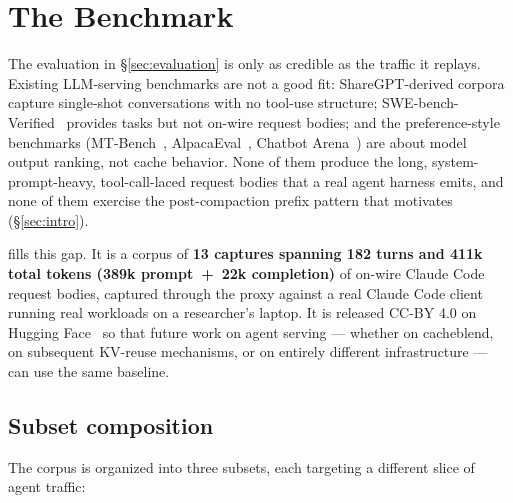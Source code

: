 
\section{The \dataset{} Benchmark}
\label{sec:benchmark}

The evaluation in \S\ref{sec:evaluation} is only as credible as
the traffic it replays. Existing LLM-serving benchmarks are not a good
fit: ShareGPT-derived corpora capture single-shot conversations with no
tool-use structure; SWE-bench-Verified~\cite{swe-bench-verified,
swe-bench-iclr} provides tasks but not on-wire request bodies; and the
preference-style benchmarks (MT-Bench~\cite{mtbench},
Alpaca\-Eval~\cite{alpacaeval}, Chatbot
Arena~\cite{chatbot-arena}) are about model output ranking, not cache
behavior. None of them produce the long, system-prompt-heavy,
tool-call-laced request bodies that a real agent harness emits, and
none of them exercise the post-compaction prefix pattern that motivates
\sys{} (\S\ref{sec:intro}).

\dataset{} fills this gap. It is a corpus of \textbf{13 captures
spanning 182 turns and 411k total tokens (389k prompt~+~22k
completion)} of on-wire Claude Code request bodies, captured through
the \sys{} proxy against a real Claude Code client running real
workloads on a researcher's laptop. It is released CC-BY 4.0 on
Hugging Face~\cite{claudecode-trace-hf} so that future work on agent
serving --- whether on cacheblend, on subsequent KV-reuse mechanisms,
or on entirely different infrastructure --- can use the same baseline.

\subsection{Subset composition}
\label{sec:dataset-subsets}

The corpus is organized into three subsets, each targeting a different
slice of agent traffic:

